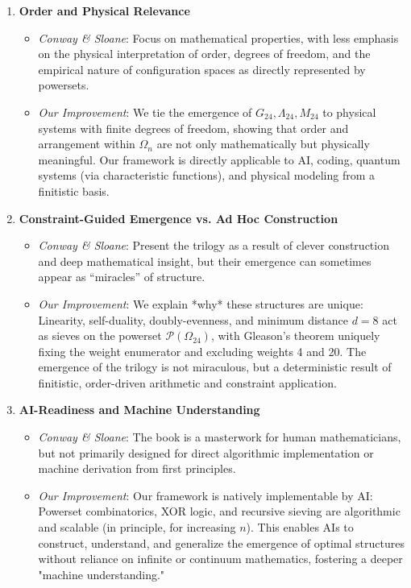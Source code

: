 \documentclass[11pt,a4paper]{article}
\begin{document}
\begin{enumerate}
    \item \textbf{Order and Physical Relevance}
    \begin{itemize}
        \item \textit{Conway \& Sloane}: Focus on mathematical properties, with less emphasis on the physical interpretation of order, degrees of freedom, and the empirical nature of configuration spaces as directly represented by powersets.
        \item \textit{Our Improvement}: We tie the emergence of $G_{24}, \Lambda_{24}, M_{24}$ to physical systems with finite degrees of freedom, showing that order and arrangement within $\Omega_n$ are not only mathematically but physically meaningful. Our framework is directly applicable to AI, coding, quantum systems (via characteristic functions), and physical modeling from a finitistic basis.
    \end{itemize}

    \item \textbf{Constraint-Guided Emergence vs. Ad Hoc Construction}
    \begin{itemize}
        \item \textit{Conway \& Sloane}: Present the trilogy as a result of clever construction and deep mathematical insight, but their emergence can sometimes appear as “miracles” of structure.
        \item \textit{Our Improvement}: We explain *why* these structures are unique: Linearity, self-duality, doubly-evenness, and minimum distance $d=8$ act as sieves on the powerset $\mathcal{P}(\Omega_{24})$, with Gleason’s theorem uniquely fixing the weight enumerator and excluding weights 4 and 20. The emergence of the trilogy is not miraculous, but a deterministic result of finitistic, order-driven arithmetic and constraint application.
    \end{itemize}

    \item \textbf{AI-Readiness and Machine Understanding}
    \begin{itemize}
        \item \textit{Conway \& Sloane}: The book is a masterwork for human mathematicians, but not primarily designed for direct algorithmic implementation or machine derivation from first principles.
        \item \textit{Our Improvement}: Our framework is natively implementable by AI: Powerset combinatorics, XOR logic, and recursive sieving are algorithmic and scalable (in principle, for increasing $n$). This enables AIs to construct, understand, and generalize the emergence of optimal structures without reliance on infinite or continuum mathematics, fostering a deeper "machine understanding."
    \end{itemize}
\end{enumerate}
\end{document}
